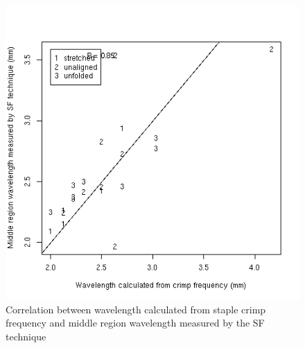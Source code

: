 %

\begin{figure}[!h]
  \centering
  \includegraphics[width=1.0\textwidth]{figcrimpwavlsfmid.png}
  \caption{Correlation between wavelength calculated from staple crimp frequency and middle region wavelength measured by the SF technique}
  \label{fig:crimpwavlsfmid}
\end{figure}

%

